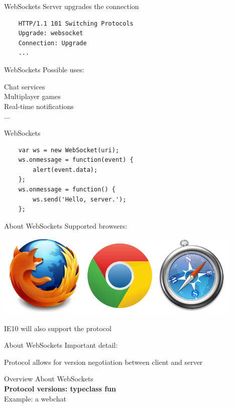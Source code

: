 \documentclass[20pt]{beamer}
\newcommand{\vspaced}{
    \vspace{5mm}
}
\begin{document}
\begin{frame}[fragile]{WebSockets}
    Server upgrades the connection
    \vspaced
    \begin{lstlisting}
    HTTP/1.1 101 Switching Protocols
    Upgrade: websocket
    Connection: Upgrade
    ...
    \end{lstlisting}
\end{frame}

\begin{frame}{WebSockets}
    Possible uses: \\
    \vspaced
    Chat services \\
    Multiplayer games \\
    Real-time notifications \\
    ...
\end{frame}

\begin{frame}[fragile]{WebSockets}
    \begin{lstlisting}
    var ws = new WebSocket(uri);
    ws.onmessage = function(event) {
        alert(event.data);
    };
    ws.onmessage = function() {
        ws.send('Hello, server.');
    };
    \end{lstlisting}
\end{frame}

\begin{frame}{About WebSockets}
    Supported browsers:
    \begin{center}
    \includegraphics[width=0.9\textwidth]{images/browsers.png}
    \end{center}
    IE10 will also support the protocol
\end{frame}

\begin{frame}{About WebSockets}
    Important detail: \\
    \vspaced
    Protocol allows for version negotiation between client and server
\end{frame}


\begin{frame}{Overview}
    About WebSockets \\
    \textbf{Protocol versions: typeclass fun} \\
    Example: a webchat \\
\end{frame}
\end{document}
